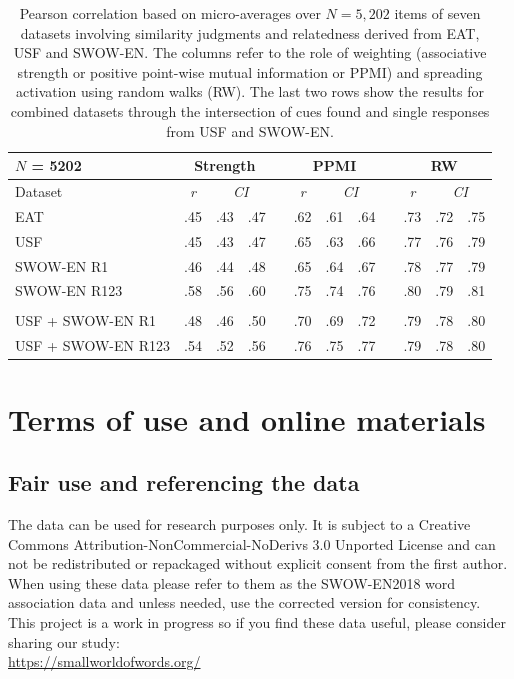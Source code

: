 \documentclass[a4paper,doc,natbib,floatsintext]{apa6}
\begin{document}
\begin{appendix}
\begin{table}
\centering
\caption{Pearson correlation based on micro-averages over $N = 5,202$ items of seven datasets involving similarity judgments and relatedness derived from EAT, USF and SWOW-EN.
The columns refer to the role of weighting (associative strength or positive point-wise mutual information or PPMI) and spreading activation using random walks (RW).
The last two rows show the results for combined datasets through the intersection of cues found and single responses from USF and SWOW-EN.}
\label{Table:simSummary_SWOW}
\begin{tabular}{lccccccccccc}
\hline
$N$ = 5202 & \multicolumn{3}{c}{\textbf{Strength}} & \multicolumn{1}{l}{} & \multicolumn{3}{c}{PPMI} & \multicolumn{1}{l}{} & \multicolumn{3}{c}{\textbf{RW}} \\
\hline
Dataset & \textit{r} & \multicolumn{2}{c}{\textit{CI}} & & \textit{r} & \multicolumn{2}{c}{\textit{CI}} & & \textit{r} & \multicolumn{2}{c}{\textit{CI}} \\
\cline{2-4} \cline{6-8} \cline{10-12}
EAT	 				& .45	 & .43	 & .47	 & 	 & .62	 & .61	 & .64	 & 	 & .73	 & .72	 & .75 \\
USF	 				& .45	 & .43	 & .47	 & 	 & .65	 & .63	 & .66	 & 	 & .77	 & .76	 & .79 \\
SWOW-EN R1	 		& .46	 & .44	 & .48	 & 	 & .65	 & .64	 & .67	 & 	 & .78	 & .77	 & .79 \\
SWOW-EN R123	 	& .58	 & .56	 & .60	 & 	 & .75	 & .74	 & .76	 & 	 & .80	 & .79	 & .81 \\
\\
USF + SWOW-EN R1	& .48	 & .46	 & .50	 & 	 & .70	 & .69	 & .72	 & 	 & .79	 & .78	 & .80 \\
USF + SWOW-EN R123	& .54	 & .52	 & .56	 & 	 & .76	 & .75	 & .77	 & 	 & .79	 & .78	 & .80 \\
\hline
\end{tabular}
\end{table}

\FloatBarrier


\section{Terms of use and online materials}

\subsection{Fair use and referencing the data}
The data can be used for research purposes only. It is subject to a Creative Commons Attribution-NonCommercial-NoDerivs 3.0 Unported License and can not be redistributed or repackaged without explicit consent from the first author. When using these data please refer to them as the SWOW-EN2018 word association data and unless needed, use the corrected version for consistency. This project is a work in progress so if you find these data useful, please consider sharing our study:\\
\url{https://smallworldofwords.org/}



\end{appendix}
\end{document}

